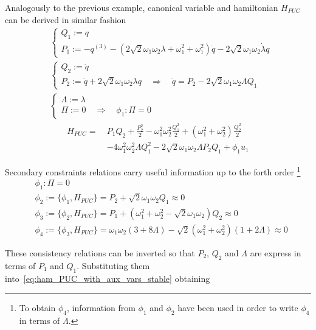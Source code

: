 Analogously to the previous example, canonical variable and hamiltonian
$H_{PUC}$ can be derived in similar fashion
\begin{align*}
  & \begin{cases}
    Q_1 := q \\
    P_1 := - q^{(3)} -
    \left( 2\sqrt{2} \omega_1\omega_2\lambda + \omega_1^2 + \omega_1^2 \right)
    \dot{q} - 2\sqrt{2}\omega_1\omega_2\dot{\lambda} q
  \end{cases} \\
  & \begin{cases}
    Q_2 := \dot{q} \\
    P_2 := \ddot{q} + 2\sqrt{2} \omega_1\omega_2\lambda q
    \quad \Rightarrow \quad
    \ddot{q} = P_2 - 2\sqrt{2} \omega_1\omega_2\Lambda Q_1
  \end{cases} \\
  & \begin{cases}
    \Lambda := \lambda \\
    \Pi := 0
    \quad  \Rightarrow \quad \phi_1: \Pi = 0
  \end{cases}
\end{align*}
\begin{align} \label{eq:ham_PUC_with_aux_vars_stable}
  H_{PUC} =\ & P_1 Q_2 + \frac{P_2^2}{2} -
  \omega_1^2\omega_2^2\frac{Q_1^2}{2} +
  \left( \omega_1^2 + \omega_2^2 \right) \frac{Q_2^2}{2} \\
  & - 4 \omega_1^2\omega_2^2\Lambda Q_1^2 -
  2\sqrt{2}\omega_1\omega_2\Lambda P_2 Q_1 + \phi_1 u_1
\end{align}

Secondary constraints relations carry useful information up to the forth order
\footnote{
  To obtain $\phi_4$, information from $\phi_1$ and $\phi_2$ have been used in
  order to write $\phi_4$ in terms of $\Lambda$.
}
\begin{align*}
  & \phi_1 : \Pi = 0 \\
  & \phi_2 := \{\phi_1, H_{PUC}\} =
    P_2 + \sqrt{2} \omega_1\omega_2 Q_1 \approx 0 \\
  & \phi_3 := \{\phi_2, H_{PUC}\} =
    P_1 + \left(\omega_1^2 + \omega_2^2 - \sqrt{2}\omega_1\omega_2 \right) Q_2
    \approx 0 \\
  & \phi_4 := \{\phi_3, H_{PUC}\} =
  \omega_1 \omega_2 (3+8\Lambda) - \sqrt{2}
  \left( \omega_1^2 + \omega_2^2 \right) \left(1 + 2\Lambda \right) \approx 0
\end{align*}

These consistency relations can be inverted so that $P_2$, $Q_2$ and $\Lambda$
are express in terms of $P_1$ and $Q_1$. Substituting them
into~\eqref{eq:ham_PUC_with_aux_vars_stable} obtaining

